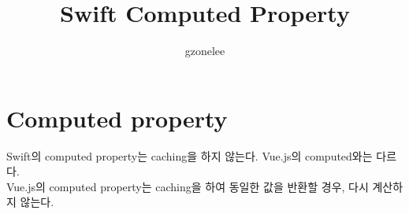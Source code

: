 \documentclass{article}
\title{Swift Computed Property}
\author{gzonelee}
\begin{document}
\maketitle
   
\section{Computed property}
Swift의 computed property는 caching을 하지 않는다. Vue.js의 computed와는 다르다. \\
Vue.js의 computed property는 caching을 하여 동일한 값을 반환할 경우, 다시 계산하지 않는다.
\end{document}
